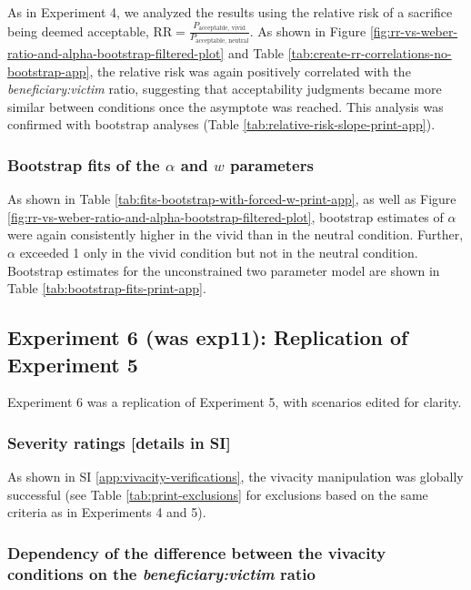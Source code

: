 \documentclass[
]{article}
\begin{document}
As in Experiment 4, we analyzed the results using the relative risk of a sacrifice being deemed acceptable, \(\mathrm{RR}= \frac{P_{\text{acceptable, vivid}}}{P_{\text{acceptable, neutral}}}\). As shown in Figure \ref{fig:rr-vs-weber-ratio-and-alpha-bootstrap-filtered-plot} and Table \ref{tab:create-rr-correlations-no-bootstrap-app}, the relative risk was again positively correlated with the \emph{beneficiary:victim} ratio, suggesting that acceptability judgments became more similar between conditions once the asymptote was reached. This analysis was confirmed with bootstrap analyses (Table \ref{tab:relative-risk-slope-print-app}).

\subsubsection{\texorpdfstring{Bootstrap fits of the \(\alpha\) and \(w\) parameters}{Bootstrap fits of the \textbackslash alpha and w parameters}}\label{bootstrap-fits-of-the-alpha-and-w-parameters}

As shown in Table \ref{tab:fits-bootstrap-with-forced-w-print-app}, as well as Figure \ref{fig:rr-vs-weber-ratio-and-alpha-bootstrap-filtered-plot}, bootstrap estimates of \(\alpha\) were again consistently higher in the vivid than in the neutral condition. Further, \(\alpha\) exceeded 1 only in the vivid condition but not in the neutral condition. Bootstrap estimates for the unconstrained two parameter model are shown in Table \ref{tab:bootstrap-fits-print-app}.

\subsection{Experiment 6 (was exp11): Replication of Experiment 5}\label{experiment-6-was-exp11-replication-of-experiment-5}

Experiment 6 was a replication of Experiment 5, with scenarios edited for clarity.

\subsubsection{Severity ratings {[}details in SI{]}}\label{severity-ratings-details-in-si-1}

As shown in SI \ref{app:vivacity-verifications}, the vivacity manipulation was globally successful (see Table \ref{tab:print-exclusions} for exclusions based on the same criteria as in Experiments 4 and 5).

\subsubsection{\texorpdfstring{Dependency of the difference between the vivacity conditions on the \emph{beneficiary:victim} ratio}{Dependency of the difference between the vivacity conditions on the beneficiary:victim ratio}}\label{dependency-of-the-difference-between-the-vivacity-conditions-on-the-beneficiaryvictim-ratio-2}
\end{document}
